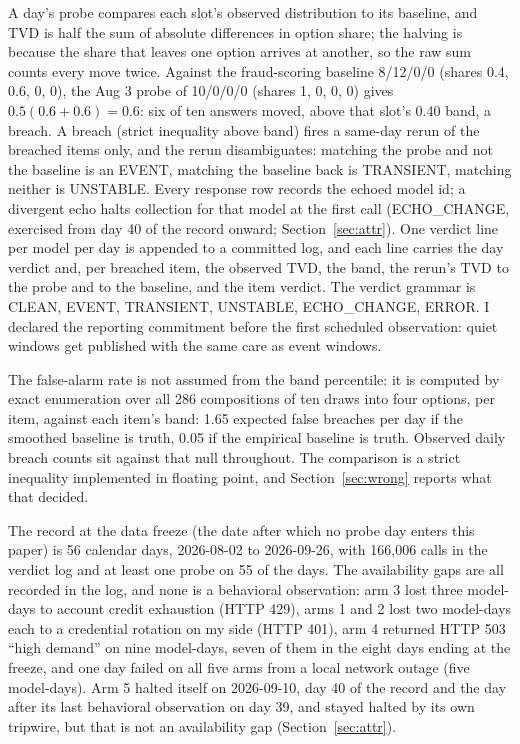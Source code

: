 \documentclass[conference]{IEEEtran}
\begin{document}
A day's probe compares each slot's observed distribution to its
baseline, and TVD is half the sum of absolute differences in option
share; the halving is because the share that leaves one option arrives
at another, so the raw sum counts every move twice. Against the
fraud-scoring baseline 8/12/0/0 (shares 0.4, 0.6, 0, 0), the Aug 3
probe of 10/0/0/0 (shares 1, 0, 0, 0) gives $0.5(0.6 + 0.6) = 0.6$:
six of ten answers moved, above that slot's 0.40 band, a breach. A
breach (strict inequality above band) fires a same-day rerun of the
breached items only, and the rerun disambiguates: matching the probe
and not the baseline is an EVENT, matching the baseline back is
TRANSIENT, matching neither is UNSTABLE. Every response row records
the echoed model id; a divergent echo halts collection for that model
at the first call (ECHO\_CHANGE, exercised from day 40 of the record
onward; Section~\ref{sec:attr}). One verdict line per model per day is
appended to a committed log, and each line carries the day verdict
and, per breached item, the observed TVD, the band, the rerun's TVD to
the probe and to the baseline, and the item verdict. The verdict
grammar is CLEAN, EVENT, TRANSIENT, UNSTABLE, ECHO\_CHANGE, ERROR. I
declared the reporting commitment before the first scheduled
observation: quiet windows get published with the same care as event
windows.

The false-alarm rate is not assumed from the band percentile: it is
computed by exact enumeration over all 286 compositions of ten draws
into four options, per item, against each item's band: 1.65 expected
false breaches per day if the smoothed baseline is truth, 0.05 if the
empirical baseline is truth. Observed daily breach counts sit against
that null throughout. The comparison is a strict inequality
implemented in floating point, and Section~\ref{sec:wrong} reports
what that decided.

The record at the data freeze (the date after which no probe day
enters this paper) is 56 calendar days, 2026-08-02 to 2026-09-26, with
166,006 calls in the verdict log and at least one probe on 55 of the
days. The availability gaps are all recorded in the log, and none is a
behavioral observation: arm 3 lost three model-days to account credit
exhaustion (HTTP 429), arms 1 and 2 lost two model-days each to a
credential rotation on my side (HTTP 401), arm 4 returned HTTP 503
``high demand'' on nine model-days, seven of them in the eight days
ending at the freeze, and one day failed on all five arms from a local
network outage (five model-days). Arm 5 halted itself on 2026-09-10,
day 40 of the record and the day after its last behavioral observation
on day 39, and stayed halted by its own tripwire, but that is not an
availability gap (Section~\ref{sec:attr}).
\end{document}
